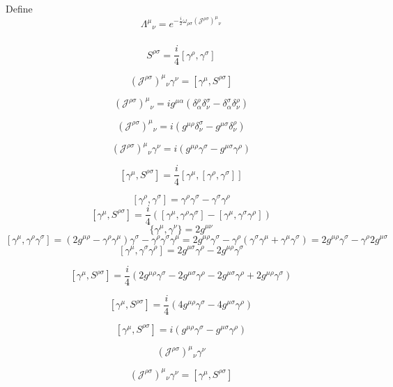 \documentclass[11pt]{article}
\begin{document}
Define $$\Lambda^\mu{}_\nu = e^{-\frac{i}{2}\omega_{\rho\sigma}(\mathcal J^{\rho\sigma})^\mu{}_\nu}$$

\subsubsection{}

\[
S^{\rho\sigma}=\frac{i}{4}[\gamma^\rho,\gamma^\sigma]
\]

\[
(\mathcal J^{\rho\sigma})^\mu{}_\nu\gamma^\nu
=
[\gamma^\mu,S^{\rho\sigma}]
\]

\[
(\mathcal J^{\rho\sigma})^\mu{}_\nu
=
i g^{\mu\alpha}
\left(
\delta^\rho_\alpha\delta^\sigma_\nu
-
\delta^\sigma_\alpha\delta^\rho_\nu
\right)
\]

\[
(\mathcal J^{\rho\sigma})^\mu{}_\nu
=
i
\left(
g^{\mu\rho}\delta^\sigma_\nu
-
g^{\mu\sigma}\delta^\rho_\nu
\right)
\]

\[
(\mathcal J^{\rho\sigma})^\mu{}_\nu\gamma^\nu
=
i
\left(
g^{\mu\rho}\gamma^\sigma
-
g^{\mu\sigma}\gamma^\rho
\right)
\]

\[
[\gamma^\mu,S^{\rho\sigma}]
=
\frac{i}{4}
[\gamma^\mu,[\gamma^\rho,\gamma^\sigma]]
\]

\[
[\gamma^\rho,\gamma^\sigma]
=
\gamma^\rho\gamma^\sigma-\gamma^\sigma\gamma^\rho
\]
\[
[\gamma^\mu,S^{\rho\sigma}]
=
\frac{i}{4}
\left(
[\gamma^\mu,\gamma^\rho\gamma^\sigma]
-
[\gamma^\mu,\gamma^\sigma\gamma^\rho]
\right)
\]
\[
\{\gamma^\mu,\gamma^\nu\}=2g^{\mu\nu}
\]
\[
[\gamma^\mu,\gamma^\rho\gamma^\sigma]
= (2g^{\mu\rho}-\gamma^\rho\gamma^\mu)\gamma^\sigma - \gamma^\rho \gamma^\sigma \gamma^\mu = 2g^{\mu\rho}\gamma^\sigma
-
\gamma^\rho(\gamma^\sigma\gamma^\mu+\gamma^\mu\gamma^\sigma) = 
2g^{\mu\rho}\gamma^\sigma
-
\gamma^\rho2g^{\mu\sigma}
\]
\[
[\gamma^\mu,\gamma^\sigma\gamma^\rho]
=
2g^{\mu\sigma}\gamma^\rho
-
2g^{\mu\rho}\gamma^\sigma
\]

\[
[\gamma^\mu,S^{\rho\sigma}]
=
\frac{i}{4}
\left(
2g^{\mu\rho}\gamma^\sigma
-
2g^{\mu\sigma}\gamma^\rho
-
2g^{\mu\sigma}\gamma^\rho
+
2g^{\mu\rho}\gamma^\sigma
\right)
\]

\[
[\gamma^\mu,S^{\rho\sigma}]
=
\frac{i}{4}
\left(
4g^{\mu\rho}\gamma^\sigma
-
4g^{\mu\sigma}\gamma^\rho
\right)
\]

\[
[\gamma^\mu,S^{\rho\sigma}]
=
i
\left(
g^{\mu\rho}\gamma^\sigma
-
g^{\mu\sigma}\gamma^\rho
\right)
\]

\[
(\mathcal J^{\rho\sigma})^\mu{}_\nu\gamma^\nu
\]

\[
(\mathcal J^{\rho\sigma})^\mu{}_\nu\gamma^\nu
=
[\gamma^\mu,S^{\rho\sigma}]
\]
\end{document}

